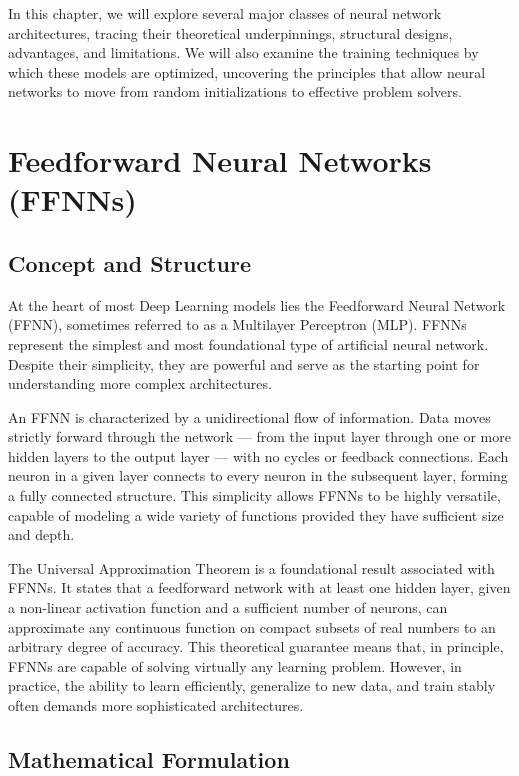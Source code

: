 \documentclass[openany]{book}
\begin{document}
In this chapter, we will explore several major classes of neural network 
architectures, tracing their theoretical underpinnings, structural designs, 
advantages, and limitations. We will also examine the training techniques by 
which these models are optimized, uncovering the principles that allow neural 
networks to move from random initializations to effective problem solvers.

\section{Feedforward Neural Networks (FFNNs)}

\subsection{Concept and Structure}

At the heart of most Deep Learning models lies the Feedforward Neural Network 
(FFNN), sometimes referred to as a Multilayer Perceptron (MLP). FFNNs represent 
the simplest and most foundational type of artificial neural network. Despite 
their simplicity, they are powerful and serve as the starting point for 
understanding more complex architectures.

An FFNN is characterized by a unidirectional flow of information. Data moves 
strictly forward through the network — from the input layer through one or more 
hidden layers to the output layer — with no cycles or feedback connections. Each 
neuron in a given layer connects to every neuron in the subsequent layer, 
forming a fully connected structure. This simplicity allows FFNNs to be highly 
versatile, capable of modeling a wide variety of functions provided they have 
sufficient size and depth.

The Universal Approximation Theorem is a foundational result associated with 
FFNNs. It states that a feedforward network with at least one hidden layer, 
given a non-linear activation function and a sufficient number of neurons, can 
approximate any continuous function on compact subsets of real numbers to an 
arbitrary degree of accuracy. This theoretical guarantee means that, in 
principle, FFNNs are capable of solving virtually any learning problem. However, 
in practice, the ability to learn efficiently, generalize to new data, and train 
stably often demands more sophisticated architectures.

\subsection{Mathematical Formulation}
\end{document}
